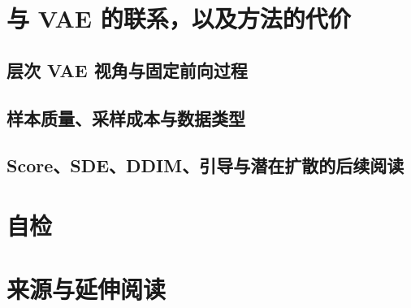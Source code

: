 \section{与 VAE 的联系，以及方法的代价}
\label{sec:diffusion-connections}
\contentplaceholder

\subsection{层次 VAE 视角与固定前向过程}
\label{subsec:diffusion-hierarchical-vae}
\contentplaceholder

\subsection{样本质量、采样成本与数据类型}
\label{subsec:diffusion-cost}
\contentplaceholder

\subsection{Score、SDE、DDIM、引导与潜在扩散的后续阅读}
\label{subsec:diffusion-future}
\contentplaceholder

\section{自检}
\label{sec:diffusion-review}
\contentplaceholder

\section{来源与延伸阅读}
\label{sec:diffusion-reading}
\contentplaceholder
